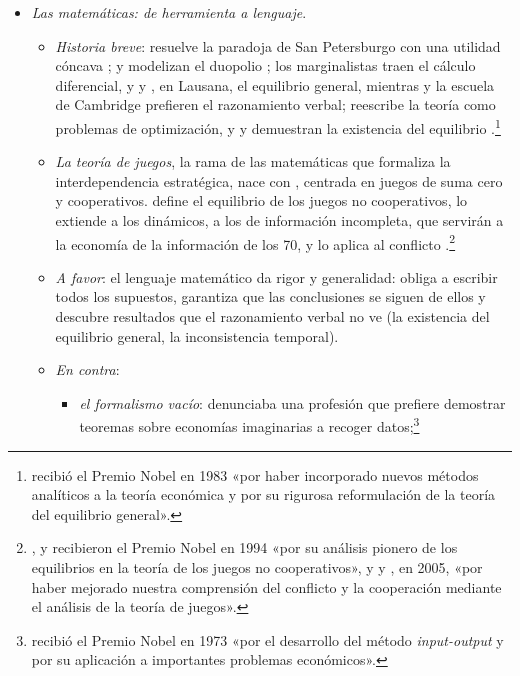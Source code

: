 \documentclass[11pt]{article}
\begin{document}
\begin{itemize}
\item \emph{Las matemáticas: de herramienta a lenguaje}.
  \begin{itemize}
  \item \emph{Historia breve}:  resuelve la paradoja de San Petersburgo con una utilidad cóncava\nocite{Bernoulli1738Specimen} ; \textcite{Cournot1838Recherches} y  modelizan el duopolio ; los marginalistas traen el cálculo diferencial, y  y , en Lausana, el equilibrio general, mientras  y la escuela de Cambridge prefieren el razonamiento verbal; \textcite{Samuelson1947Foundations} reescribe la teoría como problemas de optimización, y  y  demuestran la existencia del equilibrio .\footnote{ recibió el Premio Nobel en 1983 «por haber incorporado nuevos métodos analíticos a la teoría económica y por su rigurosa reformulación de la teoría del equilibrio general»\nocite{Nobel1983Debreu}.}
  \item \emph{La teoría de juegos}, la rama de las matemáticas que formaliza la interdependencia estratégica, nace con \textcite{VonNeumannMorgenstern1944Theory}, centrada en juegos de suma cero y cooperativos. \textcite{Nash1950Equilibrium} define el equilibrio de los juegos no cooperativos, \textcite{Selten1965Spieltheoretische} lo extiende a los dinámicos, \textcite{Harsanyi1967Games} a los de información incompleta, que servirán a la economía de la información de los 70, y \textcite{Schelling1960Strategy} lo aplica al conflicto .\footnote{,  y  recibieron el Premio Nobel en 1994 «por su análisis pionero de los equilibrios en la teoría de los juegos no cooperativos»\nocite{Nobel1994Nash}, y  y , en 2005, «por haber mejorado nuestra comprensión del conflicto y la cooperación mediante el análisis de la teoría de juegos»\nocite{Nobel2005AumannSchelling}.}
  \item \emph{A favor}: el lenguaje matemático da rigor y generalidad: obliga a escribir todos los supuestos, garantiza que las conclusiones se siguen de ellos y descubre resultados que el razonamiento verbal no ve (la existencia del equilibrio general, la inconsistencia temporal).
  \item \emph{En contra}:
    \begin{itemize}
    \item \emph{el formalismo vacío}: \textcite{Leontief1971Theoretical} denunciaba una profesión que prefiere demostrar teoremas sobre economías imaginarias a recoger datos;\footnote{ recibió el Premio Nobel en 1973 «por el desarrollo del método \emph{input-output} y por su aplicación a importantes problemas económicos»\nocite{Nobel1973Leontief}.}

\end{itemize}
\end{itemize}
\end{itemize}
\end{document}
